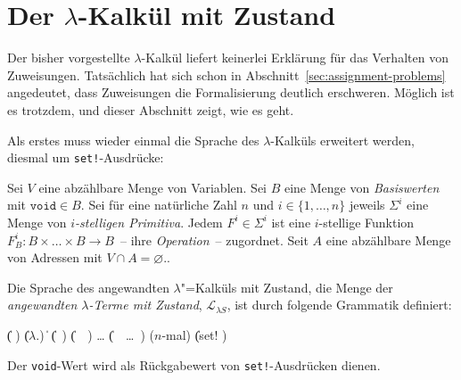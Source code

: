 \section{Der $\lambda$-Kalkül mit Zustand}

Der bisher vorgestellte $\lambda$-Kalkül liefert keinerlei Erklärung
für das Verhalten von Zuweisungen.  Tatsächlich hat sich schon in
Abschnitt~\ref{sec:assignment-problems} angedeutet, dass Zuweisungen
die Formalisierung deutlich erschweren.  Möglich ist es trotzdem, und
dieser Abschnitt zeigt, wie es geht.

Als erstes muss wieder einmal die Sprache des $\lambda$-Kalküls
erweitert werden, diesmal um \texttt{set!}-Ausdrücke:
%
\begin{definition}
  Sei $V$ eine abzählbare Menge von Variablen.  Sei $B$ eine Menge von
  \textit{Basiswerten} mit $\mathtt{void} \in B$.
  Sei für eine natürliche Zahl $n$ und $i \in \{1, \ldots, n\}$
  jeweils $\Sigma^i$ eine Menge von \textit{$i$-stelligen
    Primitiva}.  Jedem $F^i\in\Sigma^i$ ist eine
  $i$-stellige Funktion $F_B^i: B\times\ldots\times B \rightarrow
  B$~-- ihre \textit{Operation}~-- zugordnet.
  Seit $A$ eine abzählbare Menge von Adressen mit $V\cap A =
  \varnothing$.. 

  Die Sprache des angewandten $\lambda$"=Kalküls mit Zustand, die
  Menge der \textit{angewandten $\lambda$-Terme mit Zustand},
  $\mathcal{L}_{\lambda{}S}$, ist
  durch folgende Grammatik definiert:
  \begin{grammar}
     \: 
    \> \| ( )
    \> \| ($\lambda$.)
    \> \| 
    \> \| (~)
    \> \| (~~)
    \> \ldots
    \> \| (~~\ldots~)  \quad \textrm{($n$-mal)}
    \> \| (set!  )
  \end{grammar}
\end{definition}
%
Der \texttt{void}-Wert wird als Rückgabewert von
\texttt{set!}-Ausdrücken dienen.

